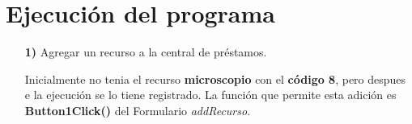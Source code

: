 \documentclass[12pt]{article}
\begin{document}
\section{Ejecución del programa}
\begin{itemize}

\item[\textbf{1)}] Agregar un recurso a la central de préstamos.
\begin{center}
\end{center}
Inicialmente no tenia el recurso \textbf{microscopio }con el \textbf{código 8}, pero despues e la ejecución se lo tiene registrado.  La función que permite esta adición es \textbf{Button1Click()} del Formulario \textit{addRecurso}. 






\end{itemize}
\end{document}
